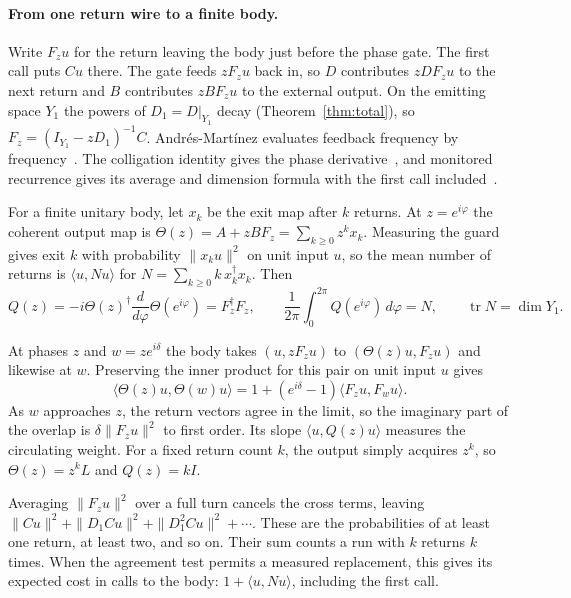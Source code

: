 \documentclass[acmsmall,screen,review,anonymous,nonacm]{acmart}
\newcommand{\tr}{\operatorname{tr}}
\numberwithin{equation}{section}
\begin{document}
\paragraph{From one return wire to a finite body.}
Write $F_zu$ for the return leaving the body just before the phase gate. The first call puts $Cu$ there. The gate feeds $zF_z u$ back in, so $D$ contributes $zDF_z u$ to the next return and $B$ contributes $zBF_z u$ to the external output. On the emitting space $Y_1$ the powers of $D_1=D|_{Y_1}$ decay (Theorem~\ref{thm:total}), so $F_z=(I_{Y_1}-zD_1)^{-1}C$.
Andr\'es-Mart\'inez evaluates feedback frequency by
frequency~\cite[Thm.~3.4.23]{AndresMartinez22Thesis}. The colligation identity gives the
phase derivative~\cite[Eq.~(4.10)]{BehrndtHassiSnoo09Colligations}, and monitored
recurrence gives its average and dimension formula with the first call
included~\cite[Eq.~(8), Thm.~3.2]{Bourgain14Subspace}.
\begin{theorem}\label{thm:deriv}
For a finite unitary body, let $x_k$ be the exit map after $k$ returns.
At $z=e^{i\varphi}$ the coherent output map is
$\Theta(z)=A+zBF_z=\sum_{k\ge0}z^k x_k$. Measuring the guard gives exit $k$
with probability $\|x_k u\|^2$ on unit input $u$, so the mean number
of returns is $\langle u,Nu\rangle$ for $N=\sum_{k\ge0}k\,x_k^\dagger x_k$. Then
\[
 Q(z)=-i\Theta(z)^\dagger\frac{d}{d\varphi}\Theta(e^{i\varphi})
     =F_z^\dagger F_z,\qquad
 \frac1{2\pi}\int_0^{2\pi}Q(e^{i\varphi})\,d\varphi=N,\qquad
 \tr N=\dim Y_1 .
\]
\end{theorem}
At phases $z$ and $w=ze^{i\delta}$ the body takes $(u,zF_z u)$ to $(\Theta(z)u,F_z u)$ and likewise at $w$. Preserving the inner product for this pair on unit input $u$ gives
\[
 \langle\Theta(z)u,\Theta(w)u\rangle
 =1+(e^{i\delta}-1)\langle F_z u,F_w u\rangle .
\]
As $w$ approaches $z$, the return vectors agree in the limit, so the imaginary
part of the overlap is $\delta\|F_z u\|^2$ to first order. Its slope
$\langle u,Q(z)u\rangle$ measures the circulating weight. For a fixed return
count $k$, the output simply acquires $z^k$, so $\Theta(z)=z^kL$ and $Q(z)=kI$.

Averaging $\|F_z u\|^2$ over a full turn cancels the cross terms, leaving
$\|Cu\|^2+\|D_1Cu\|^2+\|D_1^2Cu\|^2+\cdots$. These are the probabilities
of at least one return, at least two, and so on. Their sum counts a run with $k$ returns $k$ times. When the agreement test permits a measured replacement, this gives its expected cost in calls to the body: $1+\langle u,Nu\rangle$, including the first call.
\end{document}
